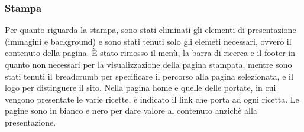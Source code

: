 \subsubsection{Stampa}
\label{ssub:stampa}
Per quanto riguarda la stampa, sono stati eliminati gli elementi di presentazione (immagini e background) e sono stati tenuti solo gli elemeti necessari, ovvero il contenuto della pagina. È stato rimosso il menù, la barra di ricerca e il footer in quanto non necessari per la visualizzazione della pagina stampata, mentre sono stati tenuti il breadcrumb per specificare il percorso alla pagina selezionata, e il logo per distinguere il sito.
Nella pagina home e quelle delle portate, in cui vengono presentate le varie ricette, è indicato il link che porta ad ogni ricetta.
Le pagine sono in bianco e nero per dare valore al contenuto anzichè alla presentazione.
